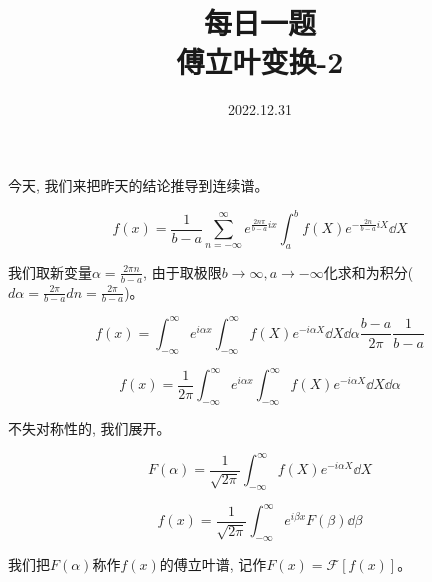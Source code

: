 \documentclass {ctexart}
\title {每日一题\\{\small 傅立叶变换-2}}
\date{2022.12.31}
\begin{document}
    \maketitle {}

    今天, 我们来把昨天的结论推导到连续谱。

    \begin{equation}
        f(x) = \frac{1}{b-a} \sum_{n=-\infty}^{\infty} e^{\frac{2n\pi}{b-a} i x} \int_a^b f(X)e^{-\frac{2n}{b-a} i X} \dd X
    \end{equation}

    我们取新变量\(\alpha = \frac{2 \pi n}{b-a}\), 由于取极限\(b \rightarrow \infty,a \rightarrow -\infty\)化求和为积分(\(d\alpha = \frac{2\pi}{b-a}dn = \frac{2\pi}{b-a}\))。

    \begin{equation}
        f(x) = \int_{-\infty}^{\infty} e^{i \alpha x} \int_{-\infty}^{\infty} f(X)e^{-i \alpha X} \dd X \dd \alpha \frac{b-a}{2\pi} \frac{1}{b-a}
    \end{equation}

    \begin{equation}
        f(x) = \frac{1}{2\pi} \int_{-\infty}^{\infty} e^{i \alpha x} \int_{-\infty}^{\infty} f(X)e^{-i \alpha X} \dd X \dd \alpha
    \end{equation}

    不失对称性的, 我们展开。

    \begin{equation}
        F(\alpha) = \frac{1}{\sqrt {2\pi}} \int_{-\infty}^{\infty} f(X)e^{-i \alpha X} \dd X
    \end{equation}

    \begin{equation}
        f(x) = \frac{1}{\sqrt {2\pi}} \int_{-\infty}^{\infty} e^{i \beta x} F(\beta) \dd \beta
    \end{equation}

    我们把\(F(\alpha)\)称作\(f(x)\)的傅立叶谱, 记作\(F(x) = \mathscr{F} [ f(x) ]\)。
\end{document}
